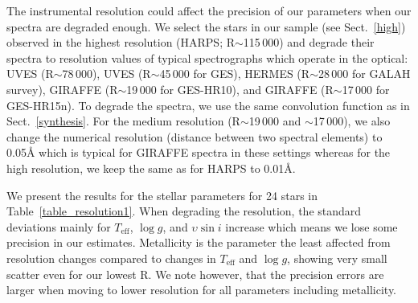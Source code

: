 \documentclass[fleqn,usenatbib]{mnras}
\begin{document}
The instrumental resolution could affect the precision of our parameters when our spectra are degraded enough. We select the stars in our sample (see Sect.~\ref{high}) observed in the 
highest resolution (HARPS; R$\sim$115\,000) and degrade their spectra to resolution values of typical spectrographs which operate in the optical: UVES (R$\sim$78\,000), UVES (R$\sim$45\,000 
for GES), HERMES (R$\sim$28\,000 for GALAH survey), GIRAFFE (R$\sim$19\,000 for GES-HR10), and GIRAFFE (R$\sim$17\,000 for GES-HR15n). To degrade the spectra, we use the same convolution function as in 
Sect.~\ref{synthesis}. For the medium resolution (R$\sim$19\,000 and $\sim$17\,000), we also change the numerical resolution (distance between two spectral elements) to 0.05\AA{} which is 
typical for GIRAFFE spectra in these settings whereas for the high resolution, we keep the same as for HARPS to 0.01\AA{}. 

We present the results for the stellar parameters for 24 stars in Table~\ref{table_resolution1}. 
When degrading the resolution, the standard deviations mainly for $T_{\mathrm{eff}}$, $\log g$, and $\upsilon  \sin i$ increase which means we lose some precision in our estimates. 
Metallicity is the parameter the least affected from resolution changes compared to changes in $T_{\mathrm{eff}}$ and $\log g$, showing very small scatter even for our lowest R. 
We note however, that the precision errors are larger when moving to lower resolution for all parameters including metallicity.

\begin{table}
\begin{center}
\caption{Mean differences and standard deviations ($\sigma$) for different resolution (R) regimes. The mean differences indicate the parameters from the degraded spectra minus the 
HARPS results for 24 stars.}
\label{table_resolution1}
\end{center}
\end{table}
\end{document}

